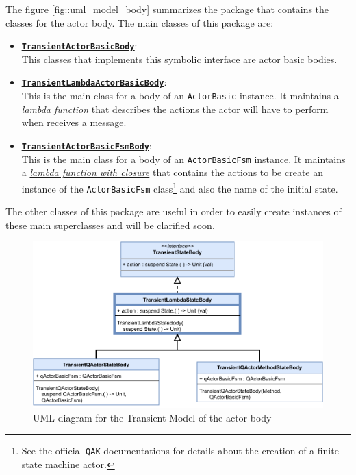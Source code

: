 The figure \ref{fig::uml_model_body} summarizes the package that contains the classes for the actor body. The main classes of this package are:

\begin{itemize}
	\item 	\href{https://github.com/LM-96/QA-Extensions/blob/main/it.unibo.qakactor/src/main/kotlin/model/actorbody/TransientActorBasicBody.kt}{\underline{\textbf{\texttt{TransientActorBasicBody}}}}:\\
	This classes that implements this symbolic interface are actor basic bodies.
	
	\item 	\href{https://github.com/LM-96/QA-Extensions/blob/main/it.unibo.qakactor/src/main/kotlin/model/actorbody/TransientLambdaActorBasicBody.kt}{\underline{\textbf{\texttt{TransientLambdaActorBasicBody}}}}:\\
	This is the main class for a body of an \texttt{ActorBasic} instance. It maintains a \href{https://kotlinlang.org/docs/lambdas.html}{\textit{lambda function}} that describes the actions the actor will have to perform when receives a message.
	
	\item 	\href{https://github.com/LM-96/QA-Extensions/blob/main/it.unibo.qakactor/src/main/kotlin/model/actorbody/TransientActorBasicFsmBody.kt}{\underline{\textbf{\texttt{TransientActorBasicFsmBody}}}}:\\
	This is the main class for a body of an \texttt{ActorBasicFsm} instance. It maintains a \href{https://kotlinlang.org/docs/lambdas.html#closures}{\textit{lambda function with closure}} that contains the actions to be create an instance of the \texttt{ActorBasicFsm} class\footnote{See the official \texttt{QAK} documentations for details about the creation of a finite state machine actor.} and also the name of the initial state.
\end{itemize}

The other classes of this package are useful in order to easily create instances of these main superclasses and will be clarified soon.

\begin{figure}[h!]
	\centering
	\includegraphics[width=\textwidth]{img/[UML]it.unibo.kaktor.model.actorbody_onlystatebody}
	\caption{UML diagram for the Transient Model of the actor body}
	\label{fig::uml_model_state_body}
\end{figure}

